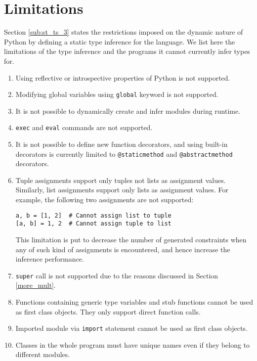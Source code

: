 \section{Limitations}
Section \ref{sub:st_ts_3} states the restrictions imposed on the dynamic nature of Python by defining a static type inference for the language. We list here the limitations of the type inference and the programs it cannot currently infer types for.

\begin{enumerate}
\item Using reflective or introspective properties of Python is not supported.
\item Modifying global variables using \lstinline|global| keyword is not supported.
\item It is not possible to dynamically create and infer modules during runtime.
\item \lstinline|exec| and \lstinline|eval| commands are not supported.
\item It is not possible to define new function decorators, and using built-in decorators is currently limited to \lstinline|@staticmethod| and \lstinline|@abstractmethod| decorators.
\item Tuple assignments support only tuples not lists as assignment values. Similarly, list assignments support only lists as assignment values. For example, the following two assignments are not supported:
\begin{lstlisting}
a, b = [1, 2]  # Cannot assign list to tuple
[a, b] = 1, 2  # Cannot assign tuple to list
\end{lstlisting}
This limitation is put to decrease the number of generated constraints when any of such kind of assignments is encountered, and hence increase the inference performance.

\item \lstinline|super| call is not supported due to the reasons discussed in Section \ref{more_mult}.

\item Functions containing generic type variables and stub functions cannot be used as first class objects. They only support direct function calls.
\item Imported module via \lstinline|import| statement cannot be used as first class objects.

\item Classes in the whole program must have unique names even if they belong to different modules.
\end{enumerate}
